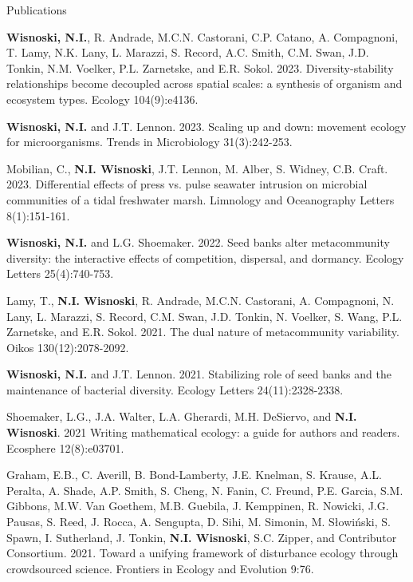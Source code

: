 \documentclass{resume} %
\begin{document}
\begin{rSection}{Publications}


\begin{etaremune}
\item {\bf Wisnoski, N.I.}, R. Andrade, M.C.N. Castorani, C.P. Catano, A. Compagnoni, T. Lamy, N.K. Lany, L. Marazzi, S. Record, A.C. Smith, C.M. Swan, J.D. Tonkin, N.M. Voelker, P.L. Zarnetske, and E.R. Sokol. 2023. Diversity-stability relationships become decoupled across spatial scales: a synthesis of organism and ecosystem types. Ecology 104(9):e4136.

\item {\bf Wisnoski, N.I.} and J.T. Lennon. 2023. Scaling up and down: movement ecology for microorganisms. Trends in Microbiology 31(3):242-253.

\item Mobilian, C., {\bf N.I. Wisnoski}, J.T. Lennon, M. Alber, S. Widney, C.B. Craft. 2023. Differential effects of press vs. pulse seawater intrusion on microbial communities of a tidal freshwater marsh. Limnology and Oceanography Letters 8(1):151-161.

\item {\bf Wisnoski, N.I.} and L.G. Shoemaker. 2022. Seed banks alter metacommunity diversity: the interactive effects of competition, dispersal, and dormancy. Ecology Letters 25(4):740-753.

\item Lamy, T., {\bf N.I. Wisnoski}, R. Andrade, M.C.N. Castorani, A. Compagnoni, N. Lany, L. Marazzi, S. Record, C.M. Swan, J.D. Tonkin, N. Voelker, S. Wang, P.L. Zarnetske, and E.R. Sokol. 2021. The dual nature of metacommunity variability. Oikos 130(12):2078-2092.

\item {\bf Wisnoski, N.I.} and J.T. Lennon. 2021. Stabilizing role of seed banks and the maintenance of bacterial diversity. Ecology Letters 24(11):2328-2338.

\item Shoemaker, L.G., J.A. Walter, L.A. Gherardi, M.H. DeSiervo, and {\bf N.I. Wisnoski}. 2021 Writing mathematical ecology: a guide for authors and readers. Ecosphere 12(8):e03701.

\item Graham, E.B., C. Averill, B. Bond-Lamberty, J.E. Knelman, S. Krause, A.L. Peralta, A. Shade, A.P. Smith, S. Cheng, N. Fanin, C. Freund, P.E. Garcia, S.M. Gibbons, M.W. Van Goethem, M.B. Guebila, J. Kemppinen, R. Nowicki, J.G. Pausas, S. Reed, J. Rocca, A. Sengupta, D. Sihi, M. Simonin, M. Słowiński, S. Spawn, I. Sutherland, J. Tonkin, {\bf N.I. Wisnoski}, S.C. Zipper, and Contributor Consortium. 2021. Toward a unifying framework of disturbance ecology through crowdsourced science. Frontiers in Ecology and Evolution 9:76.


\end{etaremune}
\end{rSection}
\end{document}
